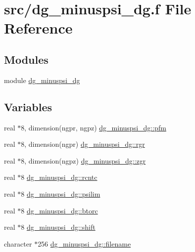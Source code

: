 \hypertarget{dg__minuspsi__dg_8f}{
\section{src/dg\_\-minuspsi\_\-dg.f File Reference}
\label{dg__minuspsi__dg_8f}
}
\subsection*{Modules}
\begin{CompactItemize}
\item 
module \hyperlink{namespacedg__minuspsi__dg}{dg\_\-minuspsi\_\-dg}
\end{CompactItemize}
\subsection*{Variables}
\begin{CompactItemize}
\item 
real $\ast$8, dimension(ngpr, ngpz) \hyperlink{namespacedg__minuspsi__dg_7c52d7de062161616c4daae88f302c48}{dg\_\-minuspsi\_\-dg::pfm}
\item 
real $\ast$8, dimension(ngpr) \hyperlink{namespacedg__minuspsi__dg_0c32314aec56f7439884635ae85f8414}{dg\_\-minuspsi\_\-dg::rgr}
\item 
real $\ast$8, dimension(ngpz) \hyperlink{namespacedg__minuspsi__dg_055027e90abf39aceabd4a50f02421ac}{dg\_\-minuspsi\_\-dg::zgr}
\item 
real $\ast$8 \hyperlink{namespacedg__minuspsi__dg_d70201e77c046670a22c0a662cf3ade5}{dg\_\-minuspsi\_\-dg::rcntc}
\item 
real $\ast$8 \hyperlink{namespacedg__minuspsi__dg_9a8c4ea8cf9c956b104c5de7d7f3bf43}{dg\_\-minuspsi\_\-dg::psilim}
\item 
real $\ast$8 \hyperlink{namespacedg__minuspsi__dg_c3c338a5853d966dbecf9104f273869e}{dg\_\-minuspsi\_\-dg::btorc}
\item 
real $\ast$8 \hyperlink{namespacedg__minuspsi__dg_1f21182b81c907694c4d1674bc7ef246}{dg\_\-minuspsi\_\-dg::shift}
\item 
character $\ast$256 \hyperlink{namespacedg__minuspsi__dg_2eaba41888ea9b54a4f395da5f6f962c}{dg\_\-minuspsi\_\-dg::filename}
\end{CompactItemize}
